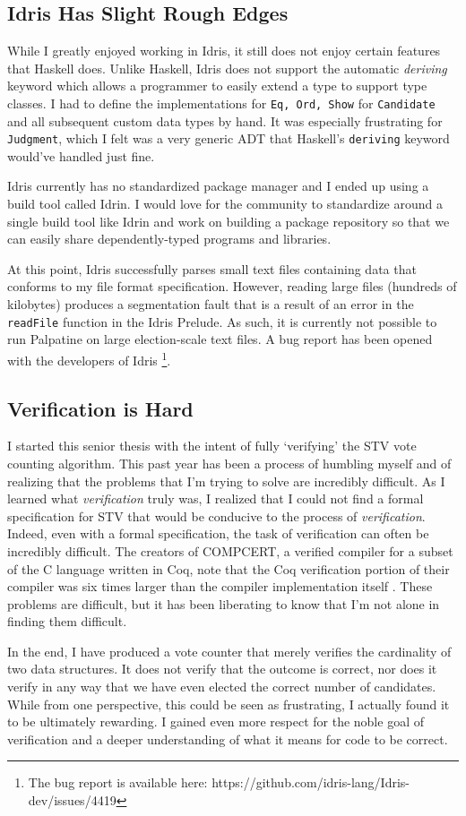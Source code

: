 \subsection{Idris Has Slight Rough Edges}

While I greatly enjoyed working in Idris, it still does not enjoy certain
features that Haskell does. Unlike Haskell, Idris does not support the automatic
\textit{deriving} keyword which allows a programmer to easily extend a type to
support type classes. I had to define the implementations for \texttt{Eq, Ord,
Show} for \texttt{Candidate} and all subsequent custom data types by hand. It
was especially frustrating for \texttt{Judgment}, which I felt was a very
generic ADT that Haskell's \texttt{deriving} keyword would've handled just fine.

Idris currently has no standardized package manager and I ended up using a build
tool called Idrin. I would love for the community to standardize around a single
build tool like Idrin and work on building a package repository so that we can
easily share dependently-typed programs and libraries. 

At this point, Idris successfully parses small text files containing data that
conforms to my file format specification. However, reading large files (hundreds
of kilobytes) produces a segmentation fault that is a result of an error in the
\texttt{readFile} function in the Idris Prelude. As such, it is currently not
possible to run Palpatine on large election-scale text files. A bug report has
been opened with the developers of Idris \footnote{The bug report is available
here: https://github.com/idris-lang/Idris-dev/issues/4419}. 

\subsection{Verification is Hard}

I started this senior thesis with the intent of fully `verifying' the STV vote
counting algorithm. This past year has been a process of humbling myself and of
realizing that the problems that I'm trying to solve are incredibly difficult.
As I learned what \textit{verification} truly was, I realized that I could not
find a formal specification for STV that would be conducive to the process of
\textit{verification}. Indeed, even with a formal specification, the task of
verification can often be incredibly difficult. The creators of COMPCERT, a
verified compiler for a subset of the C language written in Coq, note that the
Coq verification portion of their compiler was six times larger than the
compiler implementation itself \cite{compcert}. These problems are difficult,
but it has been liberating to know that I'm not alone in finding them difficult.


In the end, I have produced a vote counter that merely verifies the cardinality
of two data structures. It does not verify that the outcome is correct, nor does
it verify in any way that we have even elected the correct number of candidates.
While from one perspective, this could be seen as frustrating, I actually found
it to be ultimately rewarding. I gained even more respect for the noble goal of
verification and a deeper understanding of what it means for code to be correct.
